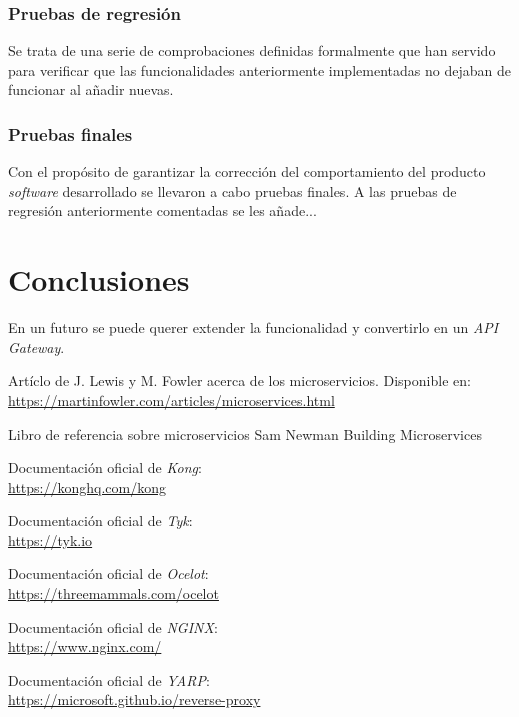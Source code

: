\documentclass[11pt,spanish,listoffigures]{tfgetsinf}
\begin{document}
\subsection{Pruebas de regresión}

Se trata de una serie de comprobaciones definidas formalmente que han servido para verificar que las funcionalidades anteriormente implementadas no dejaban de funcionar al añadir nuevas.

\subsection{Pruebas finales}

Con el propósito de garantizar la corrección del comportamiento del producto \emph{software} desarrollado se llevaron a cabo pruebas finales. A las pruebas de regresión anteriormente comentadas se les añade...


\chapter{Conclusiones}

En un futuro se puede querer extender la funcionalidad y convertirlo en un \emph{API Gateway}.


\begin{thebibliography}{10}

Artíclo de J. Lewis y M. Fowler acerca de los microservicios.
\newblock Disponible en:\\
\url{https://martinfowler.com/articles/microservices.html}

Libro de referencia sobre microservicios
\newblock Sam Newman
\newblock Building Microservices

Documentación oficial de \emph{Kong}:\\
\url{https://konghq.com/kong}

Documentación oficial de \emph{Tyk}:\\
\url{https://tyk.io}

Documentación oficial de \emph{Ocelot}:\\
\url{https://threemammals.com/ocelot}

Documentación oficial de \emph{NGINX}:\\
\url{https://www.nginx.com/}

Documentación oficial de \emph{YARP}:\\
\url{https://microsoft.github.io/reverse-proxy}

\end{thebibliography}
\end{document}

